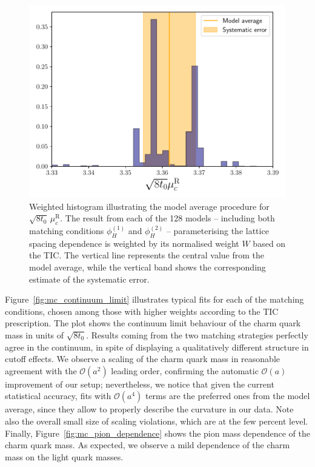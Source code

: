 \begin{figure}
	\centering
	\includegraphics[scale=0.6]{./cap6/figs/mc/hist_muc.pdf}
	\caption{Weighted histogram illustrating the model average procedure for $\sqrt{8t_0}\,\mu_c^{\textrm{R}}$. The result from each of the 128 models -- including both matching conditions $\phi_H^{(1)}$ and $\phi_H^{(2)}$ -- parameterising the lattice spacing dependence is weighted by its normalised weight $W$ based on the TIC. The vertical line represents the central value from the model average, while the vertical band shows the corresponding estimate of the systematic error.            }
	\label{fig:mc_histogram}
\end{figure}

Figure~\ref{fig:mc_continuum_limit} illustrates typical fits for each of the matching conditions, chosen 
among those with higher weights according to the TIC prescription. The plot shows  the continuum limit behaviour of 
the charm quark mass in units of $\sqrt{8t_0}$. Results coming from the two matching strategies perfectly 
agree in the continuum, in spite of displaying a qualitatively different structure in cutoff effects.
We observe a scaling of the charm quark mass in reasonable
agreement with the $\mathcal{O}(a^2)$ leading order, confirming the automatic $\mathcal{O}(a)$ improvement of our setup;
nevertheless, we notice that given the current statistical accuracy, fits with  $\mathcal{O}(a^4)$ terms are the 
preferred ones from the model average, since they allow to properly describe the curvature in our data. 
Note also the overall small size of scaling violations, which are at the few percent level.
Finally, Figure~\ref{fig:mc_pion_dependence} shows the pion  mass dependence of the charm quark mass. As 
expected, we observe a mild dependence of the charm mass on the light quark masses.
 

